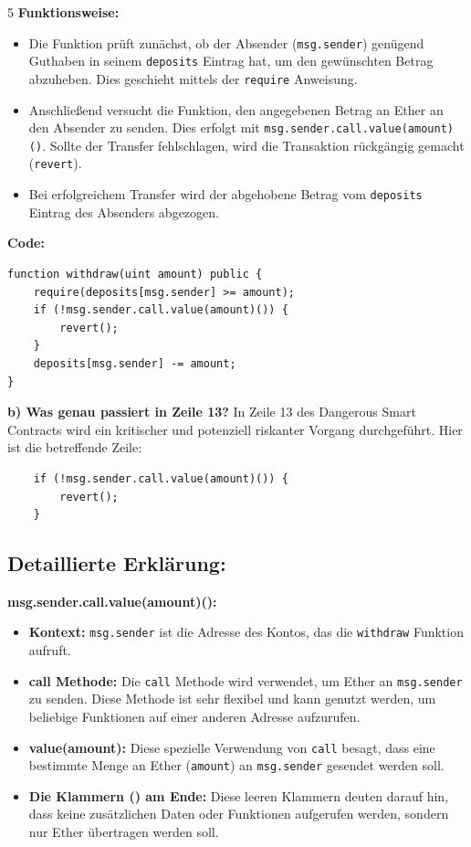 \documentclass[german]{../uebung}
\begin{document}
\begin{exercise} {5}
    \textbf{Funktionsweise:}
    \begin{itemize}
        \item Die Funktion prüft zunächst, ob der Absender (\texttt{msg.sender}) genügend Guthaben in seinem \texttt{deposits} Eintrag hat, um den gewünschten Betrag abzuheben. Dies geschieht mittels der \texttt{require} Anweisung.
        \item Anschließend versucht die Funktion, den angegebenen Betrag an Ether an den Absender zu senden. Dies erfolgt mit \texttt{msg.sender.call.value(amount)()}. Sollte der Transfer fehlschlagen, wird die Transaktion rückgängig gemacht (\texttt{revert}).
        \item Bei erfolgreichem Transfer wird der abgehobene Betrag vom \texttt{deposits} Eintrag des Absenders abgezogen.
    \end{itemize}

    \textbf{Code:}
    \begin{verbatim}
function withdraw(uint amount) public {
    require(deposits[msg.sender] >= amount);
    if (!msg.sender.call.value(amount)()) {
        revert();
    }
    deposits[msg.sender] -= amount;
}
\end{verbatim}

    \textbf{b) Was genau passiert in Zeile 13?}
    In Zeile 13 des Dangerous Smart Contracts wird ein kritischer und potenziell riskanter Vorgang durchgeführt. Hier ist die betreffende Zeile:

    \begin{verbatim}
    if (!msg.sender.call.value(amount)()) {
        revert();
    }
    \end{verbatim}

    \subsection*{Detaillierte Erklärung:}

    \textbf{msg.sender.call.value(amount)():}

    \begin{itemize}
        \item \textbf{Kontext:} \texttt{msg.sender} ist die Adresse des Kontos, das die \texttt{withdraw} Funktion aufruft.
        \item \textbf{call Methode:} Die \texttt{call} Methode wird verwendet, um Ether an \texttt{msg.sender} zu senden. Diese Methode ist sehr flexibel und kann genutzt werden, um beliebige Funktionen auf einer anderen Adresse aufzurufen.
        \item \textbf{value(amount):} Diese spezielle Verwendung von \texttt{call} besagt, dass eine bestimmte Menge an Ether (\texttt{amount}) an \texttt{msg.sender} gesendet werden soll.
        \item \textbf{Die Klammern () am Ende:} Diese leeren Klammern deuten darauf hin, dass keine zusätzlichen Daten oder Funktionen aufgerufen werden, sondern nur Ether übertragen werden soll.
    \end{itemize}


\end{exercise}
\end{document}
